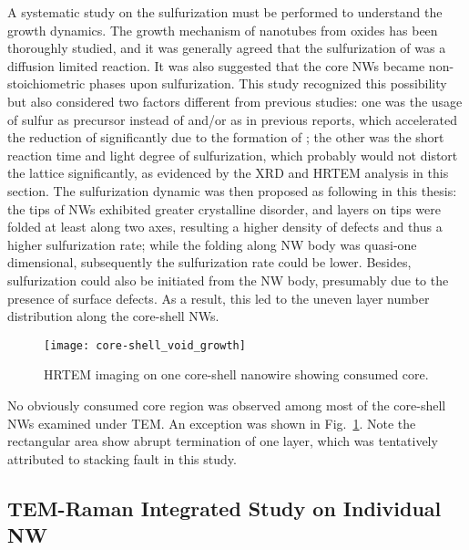 A systematic study on the sulfurization must be performed to understand the growth dynamics. The growth mechanism of  nanotubes from oxides has been thoroughly studied,\cite{Feldman1998} and it was generally agreed that the sulfurization of  was a diffusion limited reaction.\cite{Feldman1996} It was also suggested that the core  NWs became non-stoichiometric phases upon sulfurization.\cite{Feldman1996,ZAK2009} This study recognized this possibility but also considered two factors different from previous studies: one was the usage of sulfur as precursor instead of  and/or  as in previous reports, which accelerated the reduction of  significantly due to the formation of ; the other was the short reaction time and light degree of sulfurization, which probably would not distort the  lattice significantly, as evidenced by the XRD and HRTEM analysis in this section. The sulfurization dynamic was then proposed as following in this thesis: the tips of  NWs exhibited greater crystalline disorder, and  layers on tips were folded at least along two axes, resulting a higher density of defects and thus a higher sulfurization rate; while the folding along NW body was quasi-one dimensional, subsequently the sulfurization rate could be lower. Besides, sulfurization could also be initiated from the NW body, presumably due to the presence of surface defects. As a result, this led to the uneven  layer number distribution along the core-shell NWs.

\begin{figure}[htb]
\centering
\texttt{[image: core-shell\_void\_growth]}
\caption[HRTEM imaging on one core-shell nanowire showing consumed core]{HRTEM imaging on one core-shell nanowire showing consumed core.}
\label{fig:ch5ws2tem2}
\end{figure}
No obviously consumed core region was observed among most of the core-shell NWs examined under TEM. An exception was shown in Fig.~\ref{fig:ch5ws2tem2}. Note the rectangular area show abrupt termination of one  layer, which was tentatively attributed to stacking fault in this study.


\subsection{TEM-Raman Integrated Study on Individual NW}\label{tms:raman} 

